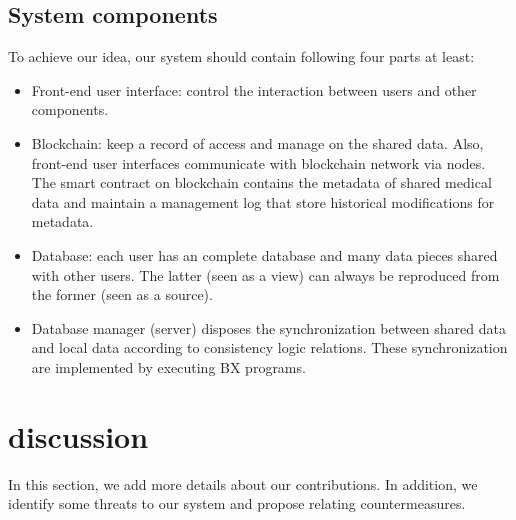 \documentclass[conference]{IEEEtran}
\begin{document}
\subsection{System components}
To achieve our idea, our system should contain following four parts at least:%
\begin{itemize}
	\item Front-end user interface: control the interaction between users and other components.
	
	\item Blockchain: keep a record of access and manage on the shared data. Also, front-end user interfaces communicate with blockchain network via nodes. The smart contract on blockchain contains the metadata of shared medical data and maintain a management log that store historical modifications for metadata.
	
	\item Database: each user has an complete database and many data pieces shared with other users. The latter (seen as a view) can always be reproduced from the former (seen as a source).
	
	\item Database manager (server) disposes the synchronization between shared data and local data according to consistency logic relations. These synchronization are implemented by executing BX programs.
	
\end{itemize}

\section{discussion}
\label{discuss}
In this section, we add more details about our contributions. In addition, we identify some threats to our system and propose relating countermeasures.
\end{document}
